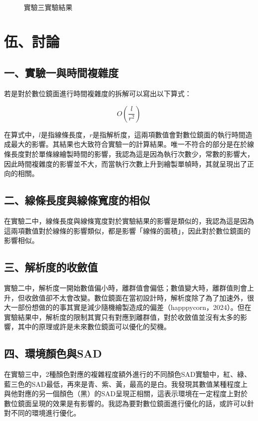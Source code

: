\documentclass[12pt]{article}
\begin{document}
\begin{figure}[htbp]
  \caption{實驗三實驗結果}\label{fig:result_5}

\end{figure}

\newpage
\section{伍、討論}

\subsection{一、實驗一與時間複雜度}

若是對於數位鏡面進行時間複雜度的拆解可以寫出以下算式：

\[
O(\frac{l}{r^2}) 
\]

在算式中，$l$是指線條長度，$r$是指解析度，這兩項數值會對數位鏡面的執行時間造成最大的影響。其結果也大致符合實驗一的計算結果。唯一不符合的部分是在於線條長度對於單條線繪製時間的影響，我認為這是因為執行次數少，常數的影響大，因此時間複雜度的影響並不大，而當執行次數上升到繪製單幀時，其就呈現出了正向的相關。

\subsection{二、線條長度與線條寬度的相似}

在實驗二中，線條長度與線條寬度對於實驗結果的影響是類似的，我認為這是因為這兩項數值對於線條的影響類似，都是影響「線條的面積」，因此對於數位鏡面的影響相似。

\subsection{三、解析度的收斂值}

實驗二中，解析度一開始數值偏小時，離群值會偏低；數值變大時，離群值則會上升，但收斂值卻不太會改變。數位鏡面在當初設計時，解析度除了為了加速外，很大一部份想做的的事其實是減少隨機繪製造成的偏差（happpycorn，2024）。但在實驗結果中，解析度的限制其實只有對應到離群值，對於收斂值並沒有太多的影響，其中的原理或許是未來數位鏡面可以優化的契機。

\subsection{四、環境顏色與SAD}

在實驗三中，2種顏色對應的複雜程度額外進行的不同顏色SAD實驗中，紅、綠、藍三色的SAD最低，再來是青、紫、黃，最高的是白。我發現其數值某種程度上與他對應的另一個顏色（黑）的SAD呈現正相關，這表示環境在一定程度上對於數位鏡面呈現的效果是有影響的。我認為要對數位鏡面進行優化的話，或許可以針對不同的環境進行優化。
\end{document}
